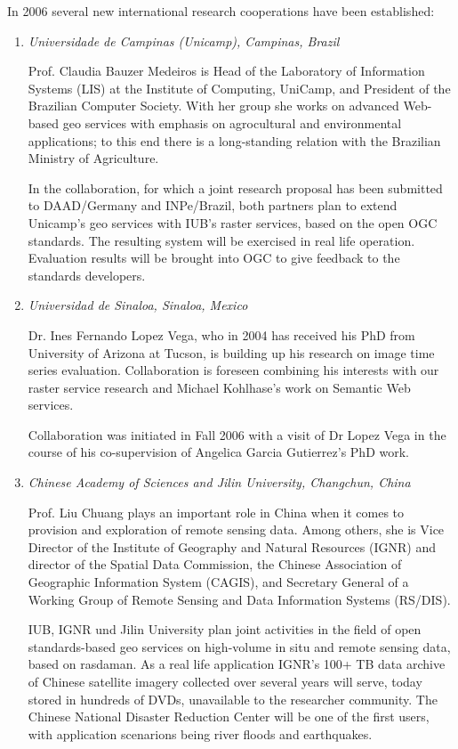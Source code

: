 In 2006 several new international research cooperations have been established:
\begin{enumerate}
\item {\sl Universidade de Campinas (Unicamp), Campinas, Brazil}

  Prof. Claudia Bauzer Medeiros is Head of the Laboratory of Information Systems (LIS) at
  the Institute of Computing, UniCamp, and President of the Brazilian Computer
  Society. With her group she works on advanced Web-based geo services with emphasis on
  agrocultural and environmental applications; to this end there is a long-standing
  relation with the Brazilian Ministry of Agriculture.

  In the collaboration, for which a joint research proposal has been submitted to
  DAAD/Germany and INPe/Brazil, both partners plan to extend Unicamp's geo services with
  IUB's raster services, based on the open OGC standards. The resulting system will be
  exercised in real life operation. Evaluation results will be brought into OGC to give
  feedback to the standards developers.

\item {\sl Universidad de Sinaloa, Sinaloa, Mexico}

  Dr. Ines Fernando Lopez Vega, who in 2004 has received his PhD from University of
  Arizona at Tucson, is building up his research on image time series
  evaluation. Collaboration is foreseen combining his interests with our raster service
  research and Michael Kohlhase's work on Semantic Web services.

  Collaboration was initiated in Fall 2006 with a visit of Dr Lopez Vega in the course of
  his co-supervision of Angelica Garcia Gutierrez's PhD work.

\item {\sl Chinese Academy of Sciences and Jilin University, Changchun, China}

  Prof. Liu Chuang plays an important role in China when it comes to provision and
  exploration of remote sensing data. Among others, she is Vice Director of the Institute
  of Geography and Natural Resources (IGNR) and director of the Spatial Data Commission,
  the Chinese Association of Geographic Information System (CAGIS), and Secretary General
  of a Working Group of Remote Sensing and Data Information Systems (RS/DIS).

  IUB, IGNR und Jilin University plan joint activities in the field of open
  standards-based geo services on high-volume in situ and remote sensing data, based on
  rasdaman. As a real life application IGNR's 100+ TB data archive of Chinese satellite
  imagery collected over several years will serve, today stored in hundreds of DVDs,
  unavailable to the researcher community. The Chinese National Disaster Reduction Center
  will be one of the first users, with application scenarions being river floods and
  earthquakes.
\end{enumerate}



